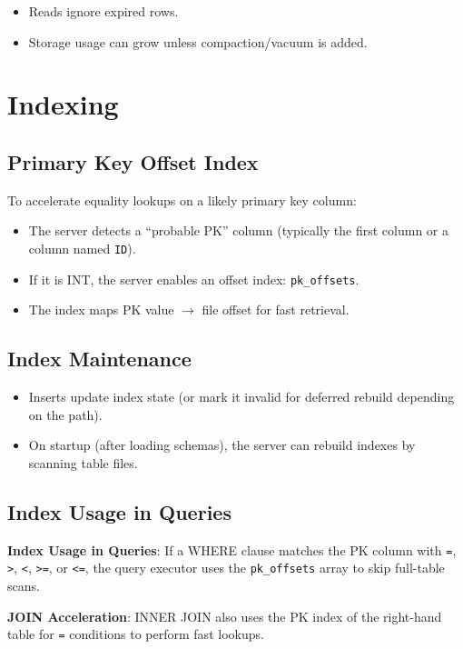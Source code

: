 \documentclass[11pt]{article}
\begin{document}
\begin{itemize}[leftmargin=*]
\item Reads ignore expired rows.
\item Storage usage can grow unless compaction/vacuum is added.
\end{itemize}

\section{Indexing}
\subsection{Primary Key Offset Index}
To accelerate equality lookups on a likely primary key column:

\begin{itemize}[leftmargin=*]
\item The server detects a ``probable PK'' column (typically the first column or a column named \texttt{ID}).
\item If it is INT, the server enables an offset index: \texttt{pk\_offsets}.
\item The index maps PK value $\rightarrow$ file offset for fast retrieval.
\end{itemize}

\subsection{Index Maintenance}
\begin{itemize}[leftmargin=*]
\item Inserts update index state (or mark it invalid for deferred rebuild depending on the path).
\item On startup (after loading schemas), the server can rebuild indexes by scanning table files.
\end{itemize}

\subsection{Index Usage in Queries}
\item \textbf{Index Usage in Queries}: If a WHERE clause matches the PK column with \texttt{=}, \texttt{>}, \texttt{<}, \texttt{>=}, or \texttt{<=}, the query executor uses the \texttt{pk\_offsets} array to skip full-table scans.
\item \textbf{JOIN Acceleration}: INNER JOIN also uses the PK index of the right-hand table for \texttt{=} conditions to perform fast lookups.
\end{document}

